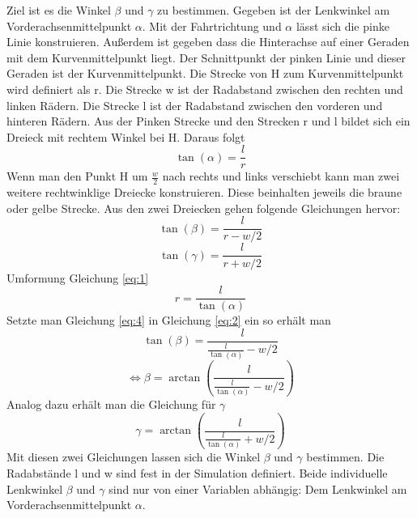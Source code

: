 Ziel ist es die Winkel $\beta$ und $\gamma$ zu bestimmen.
Gegeben ist der Lenkwinkel am Vorderachsenmittelpunkt $\alpha$. 
Mit der Fahrtrichtung und $\alpha$ lässt sich die pinke Linie konstruieren. 
Außerdem ist gegeben dass die Hinterachse auf einer Geraden mit dem Kurvenmittelpunkt liegt.
Der Schnittpunkt der pinken Linie und dieser Geraden ist der Kurvenmittelpunkt.
Die Strecke von H zum Kurvenmittelpunkt wird definiert als r.
Die Strecke w ist der Radabstand zwischen den rechten und linken Rädern.
Die Strecke l ist der Radabstand zwischen den vorderen und hinteren Rädern.
Aus der Pinken Strecke und den Strecken r und l bildet sich ein Dreieck mit rechtem Winkel bei H.
Daraus folgt 
\begin{equation} \label{eq:1}
    \tan(\alpha) = \frac{l}{r}
\end{equation}
Wenn man den Punkt H um $\frac{w}{2}$ nach rechts und links verschiebt kann man zwei weitere rechtwinklige Dreiecke konstruieren.
Diese beinhalten jeweils die braune oder gelbe Strecke. 
Aus den zwei Dreiecken gehen folgende Gleichungen hervor:
\begin{equation} \label{eq:2}
    \tan(\beta) = \frac{l}{r-w/2} 
\end{equation}
\begin{equation}  \label{eq:3}
    \tan(\gamma) = \frac{l}{r+w/2} 
\end{equation}
Umformung Gleichung \ref{eq:1}
\begin{equation} \label{eq:4}
    r = \frac{l}{\tan(\alpha)}
\end{equation}
Setzte man Gleichung \ref{eq:4} in Gleichung \ref{eq:2} ein so erhält man
\[ \tan(\beta) = \frac{l}{\frac{l}{\tan(\alpha)}-w/2}\] 
\[ \iff \beta = \arctan(\frac{l}{\frac{l}{\tan(\alpha)}-w/2})\] 
Analog dazu erhält man die Gleichung für $\gamma$
\[ \gamma = \arctan(\frac{l}{\frac{l}{\tan(\alpha)}+w/2})\] 
Mit diesen zwei Gleichungen lassen sich die Winkel $\beta$ und $\gamma$ bestimmen.
Die Radabstände l und w sind fest in der Simulation definiert.
Beide individuelle Lenkwinkel $\beta$ und $\gamma$ sind nur von einer Variablen abhängig: Dem Lenkwinkel am Vorderachsenmittelpunkt $\alpha$.
\cite{ackerman:2021}